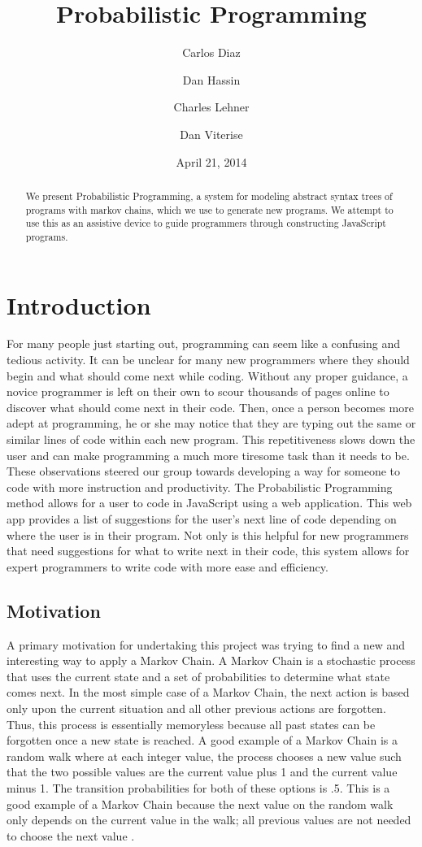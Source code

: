 \documentclass{article}
\title{
Probabilistic Programming
}
\author{
	Carlos Diaz
	\and
	Dan Hassin
	\and
	Charles Lehner
	\and
	Dan Viterise
}
\date{April 21, 2014}
\begin{document}
\maketitle

\begin{abstract}
	We present Probabilistic Programming, a system for modeling abstract syntax
	trees of programs with markov chains, which we use to generate new programs.
	We attempt to use this as an assistive device to guide programmers through
	constructing JavaScript programs.
\end{abstract}

\section{Introduction}
For many people just starting out, programming can seem like a confusing and
tedious activity. It can be unclear for many new programmers where they should
begin and what should come next while coding. Without any proper guidance, a
novice programmer is left on their own to scour thousands of pages online to
discover what should come next in their code. Then, once a person becomes more
adept at programming, he or she may notice that they are typing out the same or
similar lines of code within each new program. This repetitiveness slows down
the user and can make programming a much more tiresome task than it needs to be.
These observations steered our group towards developing a way for someone to
code with more instruction and productivity. The Probabilistic Programming
method allows for a user to code in JavaScript using a web application. This web
app provides a list of suggestions for the user's next line of code depending on
where the user is in their program. Not only is this helpful for new programmers
that need suggestions for what to write next in their code, this system allows
for expert programmers to write code with more ease and efficiency.

\subsection{Motivation}

A primary motivation for undertaking this project was trying to find a new and
interesting way to apply a Markov Chain.  A Markov Chain is a stochastic process
that uses the current state and a set of probabilities to determine what state
comes next. In the most simple case of a Markov Chain, the next action is based
only upon the current situation and all other previous actions are forgotten.
Thus, this process is essentially memoryless because all past states can be
forgotten once a new state is reached. A good example of a Markov Chain is a
random walk where at each integer value, the process chooses a new value such
that the two possible values are the current value plus 1 and the current value
minus 1. The transition probabilities for both of these options is .5. This is a
good example of a Markov Chain because the next value on the random walk only
depends on the current value in the walk; all previous values are not needed to
choose the next value \cite{markov}. 
\end{document}

